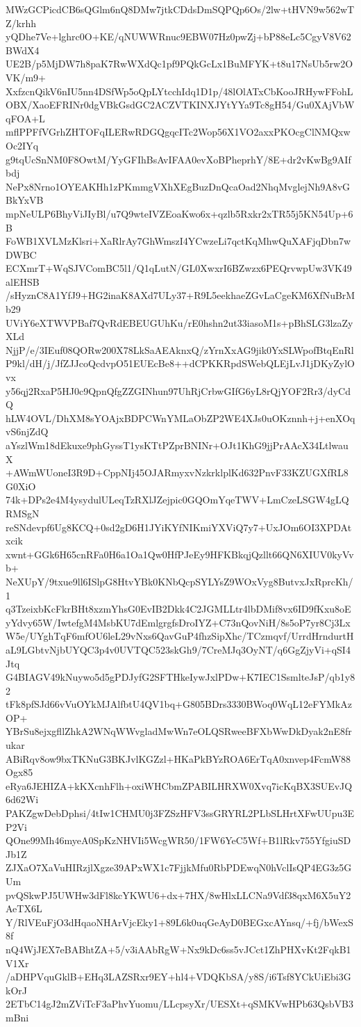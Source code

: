 MWzGCPicdCB6sQGlm6nQ8DMw7jtkCDdsDmSQPQp6Os/2lw+tHVN9w562wTZ/krhh
yQDhe7Ve+lghrc0O+KE/qNUWWRnuc9EBW07Hz0pwZj+bP88eLc5CgyV8V62BWdX4
UE2B/p5MjDW7h8paK7RwWXdQc1pf9PQkGcLx1BuMFYK+t8u17NsUb5rw2OVK/m9+
XxfzcnQikV6nIU5nn4DSfWp5oQpLYtcchIdq1D1p/48lOlATxCbKooJRHywFFohL
OBX/XaoEFRINr0dgVBkGsdGC2ACZVTKINXJYtYYa9Tc8gH54/Gu0XAjVbWqFOA+L
mflPPFfVGrhZHTOFqILERwRDGQgqcITc2Wop56X1VO2axxPKOcgClNMQxwOc2IYq
g9tqUcSnNM0F8OwtM/YyGFIhBsAvIFAA0evXoBPheprhY/8E+dr2vKwBg9AIfbdj
NePx8Nrno1OYEAKHh1zPKmmgVXhXEgBuzDnQcaOad2NhqMvglejNh9A8vGBkYxVB
mpNeULP6BhyViJIyBl/u7Q9wteIVZEoaKwo6x+qzlb5Rxkr2xTR55j5KN54Up+6B
FoWB1XVLMzKlsri+XaRlrAy7GhWmszI4YCwzeLi7qctKqMhwQuXAFjqDbn7wDWBC
ECXmrT+WqSJVComBC5l1/Q1qLutN/GL0XwxrI6BZwzx6PEQrvwpUw3VK49alEHSB
/sHyznC8A1YfJ9+HG2inaK8AXd7ULy37+R9L5eekhaeZGvLaCgeKM6XfNuBrMb29
UViY6eXTWVPBaf7QvRdEBEUGUhKu/rE0hshn2ut33iasoM1s+pBhSLG3lzaZyXLd
NjjP/e/3IEuf08QORw200X78LkSaAEAknxQ/zYrnXxAG9jik0YxSLWpofBtqEnRl
P9kl/dH/j/JfZJJcoQcdvpO51EUEcBe8++dCPKKRpdSWebQLEjLvJ1jDKyZylOvx
y56qj2RxaP5HJ0c9QpnQfgZZGINhun97UhRjCrbwGIfG6yL8rQjYOF2Rr3/dyCdQ
hLW4OVL/DhXM8sYOAjxBDPCWnYMLaObZP2WE4XJs0uOKznnh+j+enXOqvS6njZdQ
aYszlWm18dEkuxe9phGyssT1ysKTtPZprBNINr+OJt1KhG9jjPrAAcX34LtlwauX
+AWmWUoneI3R9D+CppNIj45OJARmyxvNzkrklplKd632PnvF33KZUGXfRL8G0XiO
74k+DPs2e4M4ysydulULeqTzRXlJZejpic0GQOmYqeTWV+LmCzeLSGW4gLQRMSgN
reSNdevpf6Ug8KCQ+0sd2gD6H1JYiKYfNIKmiYXViQ7y7+UxJOm6OI3XPDAtxcik
xwnt+GGk6H65cnRFa0H6a1Oa1Qw0HfPJeEy9HFKBkqjQzllt66QN6XIUV0kyVvb+
NeXUpY/9txue9ll6ISlpG8HtvYBk0KNbQcpSYLYsZ9WOxVyg8ButvxJxRprcKh/1
q3TzeixbKcFkrBHt8xzmYhsG0EvIB2Dkk4C2JGMLLtr4lbDMif8vx6ID9fKxu8oE
yYdvy65W/IwtefgM4MsbKU7dEmlgrgfsDroIYZ+C73nQovNiH/8s5oP7yr8Cj3Lx
W5e/UYghTqF6mfOU6leL29vNxs6QavGuP4fhzSipXhc/TCzmqvf/UrrdHrndurtH
aL9LGbtvNjbUYQC3p4v0UVTQC523skGh9/7CreMJq3OyNT/q6GgZjyVi+qSI4Jtq
G4BIAGV49kNuywo5d5gPDJyfG2SFTHkeIywJxlPDw+K7IEC1SsmlteJsP/qb1y82
tFk8pfSJd66vVuOYkMJAlfbtU4QV1bq+G805BDrs3330BWoq0WqL12eFYMkAzOP+
YBrSu8ejxgfllZhkA2WNqWWvgladMwWn7eOLQSRweeBFXbWwDkDyak2nE8frukar
ABiRqv8ow9bxTKNuG3BKJvlKGZzl+HKaPkBYzROA6ErTqA0xnvep4FcmW88Ogx85
eRya6JEHIZA+kKXcnhFlh+oxiWHCbmZPABILHRXW0Xvq7icKqBX3SUEvJQ6d62Wi
PAKZgwDebDphsi/4tIw1CHMU0j3FZSzHFV3ssGRYRL2PLbSLHrtXFwUUpu3EP2Vi
QOne99Mh46myeA0SpKzNHVIi5WcgWR50/1FW6YeC5Wf+B1lRkv755YfgiuSDJb1Z
ZJXaO7XaVuHIRzjlXgze39APxWX1c7FjjkMfu0RbPDEwqN0hVclIsQP4EG3z5GUm
pvQSkwPJ5UWHw3dFl8kcYKWU6+dx+7HX/8wHlxLLCNa9Vdf38qxM6X5uY2AeTX6L
Y/RlVEuFjO3dHqaoNHArVjcEky1+89L6k0uqGeAyD0BEGxcAYnsq/+fj/bWexS8f
nQ4WjJEX7eBABhtZA+5/v3iAAbRgW+Nx9kDc6ss5vJCct1ZhPHXvKt2FqkB1V1Xr
/aDHPVquGklB+EHq3LAZSRxr9EY+hl4+VDQKbSA/y8S/i6Tsf8YCkUiEbi3GkOrJ
2ETbC14gJ2mZViTcF3aPhvYuomu/LLcpsyXr/UESXt+qSMKVwHPb63QsbVB3mBni
